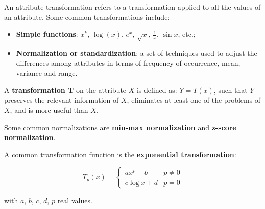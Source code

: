 An attribute transformation refers to a transformation applied to all the values of an attribute. Some common transformations include:

\begin{itemize}
    \item \textbf{Simple functions}: $x^k$, $\log (x)$, $e^x$, $\sqrt{x}$, $\frac{1}{x}$, $\sin{x}$, etc.;

    \item \textbf{Normalization or standardization}: a set of techniques used to adjust the differences among attributes in terms of frequency of occurrence, mean, variance and range.
\end{itemize}

A \textbf{transformation T} on the attribute $X$ is defined as: $Y = T(x)$, such that $Y$ preserves the relevant information of $X$, eliminates at least one of the problems of $X$, and is more useful than $X$.

Some common normalizations are \textbf{min-max normalization} and \textbf{z-score normalization}.



A common transformation function is the \textbf{exponential transformation}:

\begin{equation*}
    T_p(x) = \begin{cases}
                ax^p+ b & p \neq 0 \\
                c\log x + d & p = 0
            \end{cases}   
\end{equation*}

with $a$, $b$, $c$, $d$, $p$ real values.